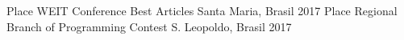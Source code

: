 \begin{cvhonors}
  \cvhonor
    { Place}
    {WEIT Conference Best Articles}
    {Santa Maria, Brasil}
    {2017}
  \cvhonor
    { Place}
    {Regional Branch of Programming Contest}
    {S. Leopoldo, Brasil}
    {2017}
\end{cvhonors}
